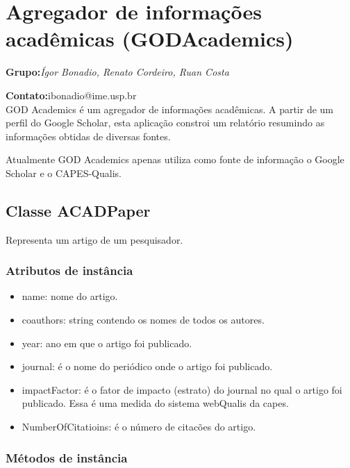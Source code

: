 \section{Agregador de informações acadêmicas (GODAcademics)}

\textbf{Grupo:}\textit{Ígor Bonadio, Renato Cordeiro, Ruan Costa}

\textbf{Contato:}ibonadio@ime.usp.br\\

GOD Academics é um agregador de informações acadêmicas. A partir de um perfil do Google Scholar, esta aplicação constroi um relatório resumindo as informações obtidas de diversas fontes.

Atualmente GOD Academics apenas utiliza como fonte de informação o Google Scholar e o CAPES-Qualis.

\subsection{Classe ACADPaper}

Representa um artigo de um pesquisador.

\subsubsection{Atributos de instância}

\begin{itemize}
  \item name: nome do artigo.

  \item coauthors: string contendo os nomes de todos os autores.

  \item year: ano em que o artigo foi publicado.

  \item journal: é o nome do periódico onde o artigo foi publicado.

  \item impactFactor: é o fator de impacto (estrato) do journal no qual o artigo foi publicado. Essa é uma  medida do sistema webQualis da capes.

  \item NumberOfCitatioins: é o número de citacões do artigo.
\end{itemize}

\subsubsection{Métodos de instância}

